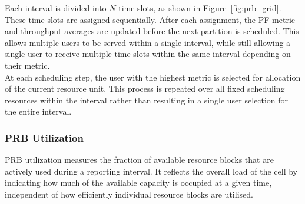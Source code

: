 
Each interval is divided into $N$ time slots, as shown in Figure~\ref{fig:prb_grid}. These time slots are assigned sequentially. After each assignment, the PF metric and throughput averages are updated before the next partition is scheduled. This allows multiple users to be served within a single interval, while still allowing a single user to receive multiple time slots within the same interval depending on their metric. \\

At each scheduling step, the user with the highest metric is selected for allocation of the current resource unit. This process is repeated over all fixed scheduling resources within the interval rather than resulting in a single user selection for the entire interval. \\



\subsubsection{PRB Utilization}
PRB utilization measures the fraction of available resource blocks that are actively used during a reporting interval. It reflects the overall load of the cell by indicating how much of the available capacity is occupied at a given time, independent of how efficiently individual resource blocks are utilised. \\

